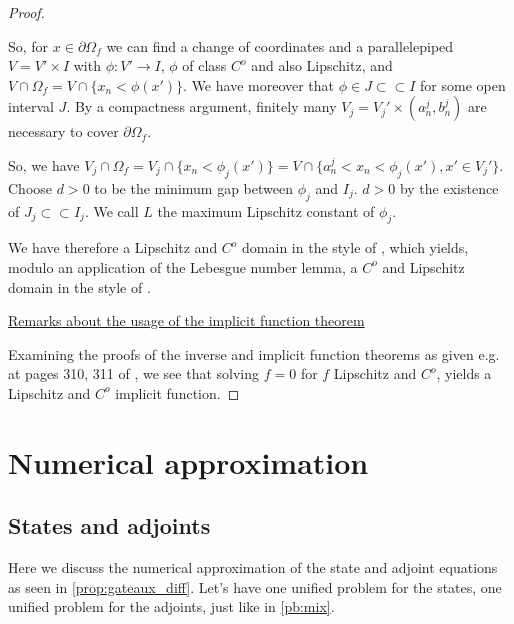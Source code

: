 \documentclass[english,a4paper,10pt,oneside]{scrbook}	%
\theoremstyle{break}
\newenvironment{mproof}[1][\proofname]{%
  \begin{proof}[#1]$ $\par\nobreak\ignorespaces
}{%
  \end{proof}
}
\renewcommand*{\proofname}{Proof}
\theoremstyle{remark}
\newcommand{\cc}{\subset\subset}
\begin{document}
\begin{mproof}
So, for $x \in \partial \Omega_f$ we can find a change of coordinates and a parallelepiped $V = V'\times I$ with $\phi: V'\rightarrow I$, $\phi$ of class $C^o$ and also Lipschitz, and $V\cap 	\Omega_f = V\cap \{x_n<\phi(x')\}$. We have moreover that $\phi \in J \cc I$ for some open interval $J$. By a compactness argument, finitely many $V_j = V_j'\times (a_n^j, b_n^j) $ are necessary to cover $\partial \Omega_f$. 

So, we have $V_j \cap \Omega_f = V_j\cap \{x_n<\phi_j(x')\} = V\cap \{a_n^j<x_n<\phi_j(x'), x' \in V_j'\}$. Choose $d>0$ to be the minimum gap between $\phi_j$ and $I_j$. $d>0$ by the existence of $J_j \cc I_j$. We call $L$ the maximum Lipschitz constant of $\phi_j$. 

We have therefore a Lipschitz and $C^o$ domain in the style of \cite{burenkov}, which yields, modulo an application of the Lebesgue number lemma, a $C^o$ and Lipschitz domain in the style of \cite{grisvard}.

\underline{Remarks about the usage of the implicit function theorem}

Examining the proofs of the inverse and implicit function theorems as given e.g. at pages 310, 311 of \cite{gilardi2}, we see that solving $f=0$ for $f$ Lipschitz and $C^o$, yields a Lipschitz and $C^o$ implicit function.

\end{mproof}

\chapter{Numerical approximation}

\section{States and adjoints}

Here we discuss the numerical approximation of the state and adjoint equations as seen in \cref{prop:gateaux_diff}. Let's have one unified problem for the states, one unified problem for the adjoints, just like in \cref{pb:mix}.
\end{document}
